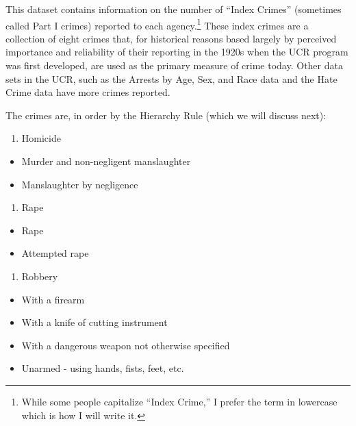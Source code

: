 \documentclass[
]{krantz}
\providecommand{\tightlist}{%
  \setlength{\itemsep}{0pt}\setlength{\parskip}{0pt}}
\begin{document}
This dataset contains information on the number of ``Index
Crimes'' (sometimes called Part I crimes) reported to each
agency.\footnote{While some people capitalize ``Index
  Crime,'' I prefer the term in lowercase which is how I
  will write it.} These index crimes are a collection of
eight crimes that, for historical reasons based largely by
perceived importance and reliability of their reporting in
the 1920s when the UCR program was first developed, are used
as the primary measure of crime today. Other data sets in
the UCR, such as the Arrests by Age, Sex, and Race data and
the Hate Crime data have more crimes reported.

The crimes are, in order by the Hierarchy Rule (which we
will discuss next):

\begin{enumerate}
\def\labelenumi{\arabic{enumi}.}
\tightlist
\item
  Homicide\\
\end{enumerate}

\begin{itemize}
\tightlist
\item
  Murder and non-negligent manslaughter\\
\item
  Manslaughter by negligence
\end{itemize}

\begin{enumerate}
\def\labelenumi{\arabic{enumi}.}
\setcounter{enumi}{1}
\tightlist
\item
  Rape\\
\end{enumerate}

\begin{itemize}
\tightlist
\item
  Rape\\
\item
  Attempted rape\\
\end{itemize}

\begin{enumerate}
\def\labelenumi{\arabic{enumi}.}
\setcounter{enumi}{2}
\tightlist
\item
  Robbery\\
\end{enumerate}

\begin{itemize}
\tightlist
\item
  With a firearm\\
\item
  With a knife of cutting instrument\\
\item
  With a dangerous weapon not otherwise specified\\
\item
  Unarmed - using hands, fists, feet, etc.\\
\end{itemize}
\end{document}

